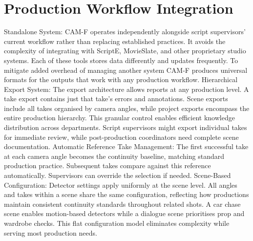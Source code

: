 \section{Production Workflow Integration}
Standalone System: CAM-F operates independently alongside script supervisors' current workflow rather than replacing established practices. It avoids the complexity of integrating with ScriptE, MovieSlate, and other proprietary studio systems. Each of these tools stores data differently and updates frequently. To mitigate added overhead of managing another system CAM-F produces universal formats for the outputs that work with any production workflow.
Hierarchical Export System: The export architecture allows reports at any production level. A take export contains just that take's errors and annotations. Scene exports include all takes organised by camera angles, while project exports encompass the entire production hierarchy. This granular control enables efficient knowledge distribution across departments. Script supervisors might export individual takes for immediate review, while post-production coordinators need complete scene documentation.
Automatic Reference Take Management: The first successful take at each camera angle becomes the continuity baseline, matching standard production practice. Subsequent takes compare against this reference automatically. Supervisors can override the selection if needed.
Scene-Based Configuration: Detector settings apply uniformly at the scene level. All angles and takes within a scene share the same configuration, reflecting how productions maintain consistent continuity standards throughout related shots. A car chase scene enables motion-based detectors while a dialogue scene prioritises prop and wardrobe checks. This flat configuration model eliminates complexity while serving most production needs.
